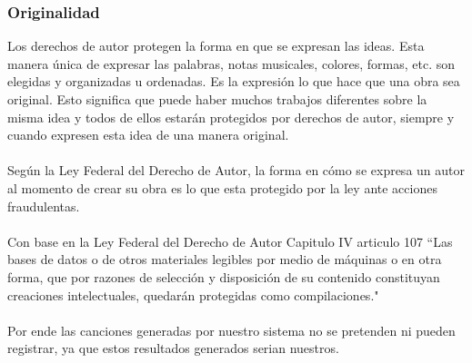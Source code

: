 \documentclass[12pt, a4paper, titlepage]{report}
\begin{document}
    	\subsubsection*{Originalidad}
    	Los derechos de autor protegen la forma en que se expresan las ideas. Esta manera única de expresar las palabras, notas musicales, colores, formas, etc. son elegidas y organizadas u ordenadas. Es la expresión lo que hace que una obra sea original. Esto significa que puede haber muchos trabajos diferentes sobre la misma idea y todos de ellos estarán protegidos por derechos de autor, siempre y cuando expresen esta idea de una manera original.\cite{refOriginalidadWipo}\\\\
    	Según la Ley Federal del Derecho de Autor, la forma en cómo se expresa un autor al momento de crear su obra es lo que esta protegido por la ley ante acciones fraudulentas.\cite{refOriginalidadLFDA}\\\\
    	Con base en la Ley Federal del Derecho de Autor Capitulo IV articulo 107 “Las bases de datos o de otros materiales legibles por medio de máquinas o en otra forma, que por razones de selección y disposición de su contenido constituyan creaciones intelectuales, quedarán protegidas como compilaciones."\cite{refOriginalidadLFDA}\\\\
    	Por ende las canciones generadas por nuestro sistema no se pretenden ni pueden registrar, ya que estos resultados generados serian nuestros.
    	
\end{document}
